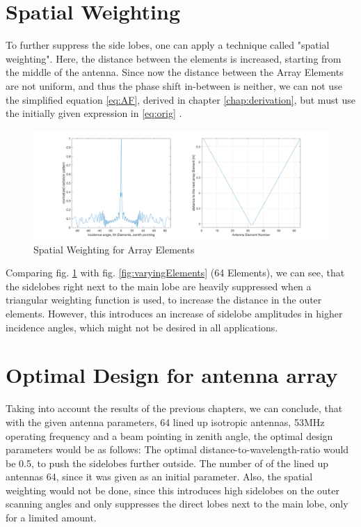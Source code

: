 \section{Spatial Weighting}
To further suppress the side lobes, one can apply a technique called "spatial weighting". Here, the distance between the elements is increased, starting from the middle of the antenna.
Since now the distance between the Array Elements are not uniform, and thus the phase shift in-between is neither, we can not use the simplified equation \ref{eq:AF}, derived in chapter \ref{chap:derivation}, but must use the initially given expression in \ref{eq:orig} \citep{roettger1989instrumental}.

\begin{figure}[h!]
	\centering
	\includegraphics[width=\textwidth]{images/triangularSpatialWeight}
	\caption{Spatial Weighting for Array Elements}
	\label{fig:triangWeight}
\end{figure}

Comparing fig. \ref{fig:triangWeight} with fig. \ref{fig:varyingElements} (64 Elements), we can see, that the sidelobes right next to the main lobe are heavily suppressed when a triangular weighting function is used, to increase the distance in the outer elements. However, this introduces an increase of sidelobe amplitudes in higher incidence angles, which might not be desired in all applications.



\section{Optimal Design for antenna array}
\label{chap:optimal}
Taking into account the results of the previous chapters, we can conclude, that with the given antenna parameters, 64 lined up isotropic antennas, 53MHz operating frequency and a beam pointing in zenith angle, the optimal design parameters would be as follows:
The optimal distance-to-wavelength-ratio would be 0.5, to push the sidelobes further outside.
The number of of the lined up antennas 64, since it was given as an initial parameter.
Also, the spatial weighting would not be done, since this introduces high sidelobes on the outer scanning angles and only suppresses the direct lobes next to the main lobe, only for a limited amount.

